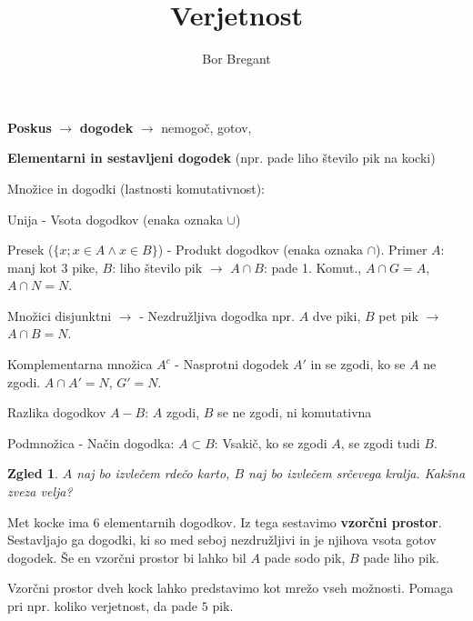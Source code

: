 \documentclass{article}
\title{Verjetnost}
\author{Bor Bregant}
\date{\vspace{-5ex}}
\newtheorem*{zgled}{Zgled}
\begin{document}
\maketitle

\textbf{Poskus} $\rightarrow$ \textbf{dogodek} $\rightarrow$ nemogoč, gotov, 

\textbf{Elementarni in sestavljeni dogodek} (npr. pade liho število pik na kocki)

Množice in dogodki (lastnosti komutativnost):

Unija - Vsota dogodkov (enaka oznaka $\cup$)

Presek ($\{x;x\in A \land x\in B\}$) - Produkt dogodkov (enaka oznaka $\cap$). Primer $A$: manj kot 3 pike, $B$: liho število pik $\rightarrow$ $A\cap B$: pade 1. Komut., $A\cap G=A$, $A\cap N=N$.

Množici disjunktni $\rightarrow$ - Nezdružljiva dogodka npr. $A$ dve piki, $B$ pet pik $\rightarrow$ $A\cap B=N$.

Komplementarna množica $A^c$ - Nasprotni dogodek $A'$ in se zgodi, ko se $A$ ne zgodi. $A\cap A'=N$, $G' =N$.

Razlika dogodkov $A-B$: $A$ zgodi, $B$ se ne zgodi, ni komutativna

Podmnožica - Način dogodka: $A\subset B$: Vsakič, ko se zgodi $A$, se zgodi tudi $B$.

\begin{zgled}
    $A$ naj bo izvlečem rdečo karto, $B$ naj bo izvlečem srčevega kralja. Kakšna zveza velja?
\end{zgled}

Met kocke ima $6$ elementarnih dogodkov. Iz tega sestavimo \textbf{vzorčni prostor}. Sestavljajo ga dogodki, ki so med seboj nezdružljivi in je njihova vsota gotov dogodek.
Še en vzorčni prostor bi lahko bil $A$ pade sodo pik, $B$ pade liho pik.

Vzorčni prostor dveh kock lahko predstavimo kot mrežo vseh možnosti. Pomaga pri npr. koliko verjetnost, da pade $5$ pik.
\end{document}
